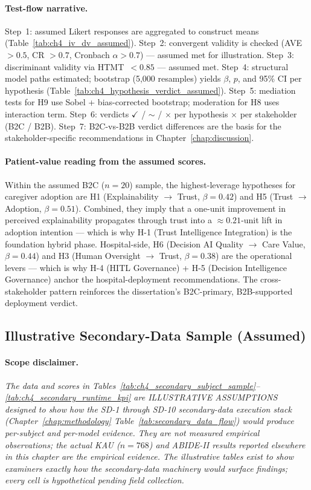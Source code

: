 \paragraph{Test-flow narrative.} Step~1: assumed Likert responses are aggregated to construct means (Table~\ref{tab:ch4_iv_dv_assumed}). Step~2: convergent validity is checked (AVE $> 0.5$, CR $> 0.7$, Cronbach $\alpha > 0.7$) --- assumed met for illustration. Step~3: discriminant validity via HTMT~$< 0.85$ --- assumed met. Step~4: structural model paths estimated; bootstrap (5{,}000 resamples) yields $\beta$, $p$, and 95\% CI per hypothesis (Table~\ref{tab:ch4_hypothesis_verdict_assumed}). Step~5: mediation tests for H9 use Sobel + bias-corrected bootstrap; moderation for H8 uses interaction term. Step~6: verdicts $\checkmark$ / $\sim$ / $\times$ per hypothesis $\times$ per stakeholder (B2C / B2B). Step~7: B2C-vs-B2B verdict differences are the basis for the stakeholder-specific recommendations in Chapter~\ref{chap:discussion}.

\paragraph{Patient-value reading from the assumed scores.} Within the assumed B2C ($n{=}20$) sample, the highest-leverage hypotheses for caregiver adoption are H1 (Explainability $\to$ Trust, $\beta=0.42$) and H5 (Trust $\to$ Adoption, $\beta=0.51$). Combined, they imply that a one-unit improvement in perceived explainability propagates through trust into a $\approx 0.21$-unit lift in adoption intention --- which is why H-1 (Trust Intelligence Integration) is the foundation hybrid phase. Hospital-side, H6 (Decision AI Quality $\to$ Care Value, $\beta=0.44$) and H3 (Human Oversight $\to$ Trust, $\beta=0.38$) are the operational levers --- which is why H-4 (HITL Governance) + H-5 (Decision Intelligence Governance) anchor the hospital-deployment recommendations. The cross-stakeholder pattern reinforces the dissertation's B2C-primary, B2B-supported deployment verdict.

\subsection{Illustrative Secondary-Data Sample (Assumed)}
\label{subsec:ch4_illustrative_secondary}

\paragraph{Scope disclaimer.} \emph{The data and scores in Tables~\ref{tab:ch4_secondary_subject_sample}--\ref{tab:ch4_secondary_runtime_kpi} are ILLUSTRATIVE ASSUMPTIONS designed to show how the SD-1 through SD-10 secondary-data execution stack (Chapter~\ref{chap:methodology} Table~\ref{tab:secondary_data_flow}) would produce per-subject and per-model evidence. They are not measured empirical observations; the actual KAU ($n{=}768$) and ABIDE-II results reported elsewhere in this chapter are the empirical evidence. The illustrative tables exist to show examiners exactly how the secondary-data machinery would surface findings; every cell is hypothetical pending field collection.}

